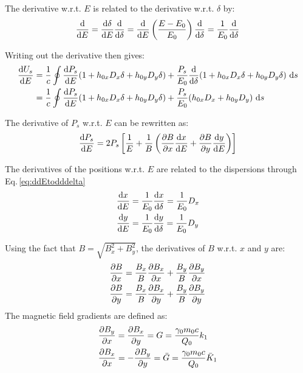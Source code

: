 The derivative w.r.t. $E$ is related to the derivative w.r.t. $\delta$ by:
\begin{equation}
    \frac{\text{d} {}}{\text{d} {E}} = \frac{\text{d} {\delta}}{\text{d} {E}} \frac{\text{d} {}}{\text{d} {\delta}} = \frac{\text{d} {}}{\text{d} {E}} \left( \frac{E - E_0}{E_0} \right) \frac{\text{d} {}}{\text{d} {\delta}} = \frac{1}{E_0} \frac{\text{d} {}}{\text{d} {\delta}}
    \label{eq:ddEtodddelta}
\end{equation}

Writing out the derivative then gives:
\begin{align}
    \frac{\text{d} {U_s}}{\text{d} {E}} &= \frac{1}{c} \oint \frac{\text{d} {P_s}}{\text{d} {E}} (1 + h_{0x}D_x \delta + h_{0y} D_y \delta) + \frac{P_s}{E_0} \frac{\text{d} {}}{\text{d} {\delta}}(1 + h_{0x}D_x \delta + h_{0y} D_y \delta)\ \text{d} s \notag \\
                    &= \frac{1}{c} \oint \frac{\text{d} {P_s}}{\text{d} {E}} (1 + h_{0x}D_x \delta + h_{0y} D_y \delta) + \frac{P_s}{E_0} (h_{0x}D_x + h_{0y} D_y)\ \text{d} s
\end{align}

The derivative of $P_s$ w.r.t. $E$ can be rewritten as:
\begin{equation}
    \frac{\text{d} {P_s}}{\text{d} {E}} = 2 P_s \left[ \frac{1}{E} + \frac{1}{B} \left( \frac{\partial {B}}{\partial {x}} \frac{\text{d} {x}}{\text{d} {E}} + \frac{\partial {B}}{\partial {y}} \frac{\text{d} {y}}{\text{d} {E}} \right) \right]
\end{equation}

The derivatives of the positions w.r.t. $E$ are related to the dispersions through Eq.\,\ref{eq:ddEtodddelta}
\begin{align}
    \frac{\text{d} {x}}{\text{d} {E}} &= \frac{1}{E_0} \frac{\text{d} {x}}{\text{d} {\delta}} = \frac{1}{E_0} D_x\\
    \frac{\text{d} {y}}{\text{d} {E}} &= \frac{1}{E_0} \frac{\text{d} {y}}{\text{d} {\delta}} = \frac{1}{E_0} D_y
\end{align}

Using the fact that $B = \sqrt{B_x^2 + B_y^2}$, the derivatives of $B$ w.r.t. $x$ and $y$ are:
\begin{align}
    \frac{\partial {B}}{\partial {x}} &= \frac{B_x}{B} \frac{\partial {B_x}}{\partial {x}} + \frac{B_y}{B} \frac{\partial {B_y}}{\partial {x}}\\
    \frac{\partial {B}}{\partial {y}} &= \frac{B_x}{B} \frac{\partial {B_x}}{\partial {y}} + \frac{B_y}{B} \frac{\partial {B_y}}{\partial {y}}
\end{align}
The magnetic field gradients are defined as:
\begin{align}
    &\frac{\partial {B_y}}{\partial {x}} = \frac{\partial {B_x}}{\partial {y}}  = G       = \frac{\gamma_0 m_0 c}{Q_0} k_1\\
    &\frac{\partial {B_x}}{\partial {x}} = -\frac{\partial {B_y}}{\partial {y}} = \bar{G} = \frac{\gamma_0 m_0 c}{Q_0} \bar{K}_1
\end{align}

